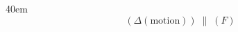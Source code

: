 \documentclass[border=8pt]{standalone}
\begin{document}
\begin{varwidth}{40em}
\LARGE\bfseries
\[ ( \Delta(\text{motion}) ) \;\parallel\; ( F ) \]
\end{varwidth}
\end{document}
